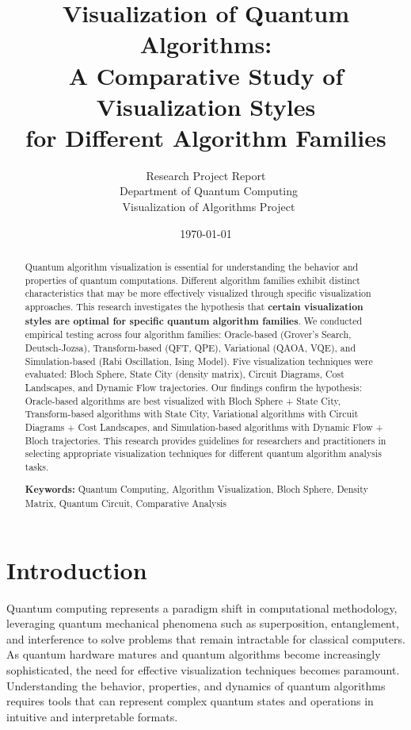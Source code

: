 \documentclass[12pt,a4paper]{article}
\title{\textbf{Visualization of Quantum Algorithms:}\\
\textbf{A Comparative Study of Visualization Styles}\\
\textbf{for Different Algorithm Families}}
\author{
    Research Project Report\\
    \ Department of Quantum Computing\\
    \ Visualization of Algorithms Project
}
\date{\today}
\begin{document}
\maketitle

\begin{abstract}
	Quantum algorithm visualization is essential for understanding the behavior and properties of quantum computations. Different algorithm families exhibit distinct characteristics that may be more effectively visualized through specific visualization approaches. This research investigates the hypothesis that \textbf{certain visualization styles are optimal for specific quantum algorithm families}. We conducted empirical testing across four algorithm families: Oracle-based (Grover's Search, Deutsch-Jozsa), Transform-based (QFT, QPE), Variational (QAOA, VQE), and Simulation-based (Rabi Oscillation, Ising Model). Five visualization techniques were evaluated: Bloch Sphere, State City (density matrix), Circuit Diagrams, Cost Landscapes, and Dynamic Flow trajectories. Our findings confirm the hypothesis: Oracle-based algorithms are best visualized with Bloch Sphere + State City, Transform-based algorithms with State City, Variational algorithms with Circuit Diagrams + Cost Landscapes, and Simulation-based algorithms with Dynamic Flow + Bloch trajectories. This research provides guidelines for researchers and practitioners in selecting appropriate visualization techniques for different quantum algorithm analysis tasks.

	\bigskip
	\textbf{Keywords:} Quantum Computing, Algorithm Visualization, Bloch Sphere, Density Matrix, Quantum Circuit, Comparative Analysis
\end{abstract}

\newpage

\section{Introduction}

Quantum computing represents a paradigm shift in computational methodology, leveraging quantum mechanical phenomena such as superposition, entanglement, and interference to solve problems that remain intractable for classical computers. As quantum hardware matures and quantum algorithms become increasingly sophisticated, the need for effective visualization techniques becomes paramount. Understanding the behavior, properties, and dynamics of quantum algorithms requires tools that can represent complex quantum states and operations in intuitive and interpretable formats.
\end{document}

